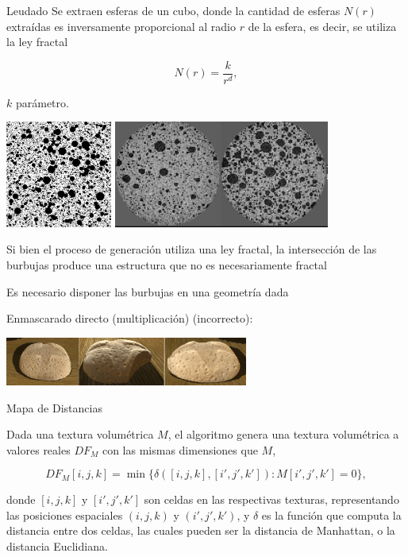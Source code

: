 \documentclass[spanish]{beamer}
\begin{document}
\begin{frame}{Leudado}
Se extraen esferas de un cubo, donde la cantidad de esferas $N(r)$ extraídas es inversamente proporcional al radio $r$ de la esfera, es decir, se utiliza la ley fractal

\begin{equation*}
N(r) = \frac{k}{r^{d}},
\end{equation*}

$k$ parámetro.

\includegraphics[height=3.5cm]{../figures/bubbles}
\includegraphics[height=3.5cm]{../figures/proving}
\end{frame}

\begin{frame}
Si bien el proceso de generación utiliza una ley fractal, la intersección de las burbujas produce una estructura que no es necesariamente fractal

\vspace{1cm}

Es necesario disponer las burbujas en una geometría dada

Enmascarado directo (multiplicación) (incorrecto):

\centerline{\includegraphics[width=8cm]{../figures/intersectProblem}}
\end{frame}

\begin{frame}{Mapa de Distancias}

Dada una textura volumétrica $M$, el algoritmo genera una textura volumétrica a valores reales $DF_{M}$ con las mismas dimensiones que $M$,


$$DF_{M}[i,j,k] = \min \bigg\{ \delta([i,j,k],[i',j',k']): M[i',j',k'] = 0 \bigg\},$$


\noindent donde $[i,j,k]$ y $[i',j',k']$ son celdas en las respectivas texturas, representando las posiciones espaciales $(i,j,k)$ y $(i',j',k')$, y $\delta$ es la función que computa la distancia entre dos celdas, las cuales pueden ser la distancia de Manhattan, o la distancia Euclidiana.

\end{frame}
\end{document}
